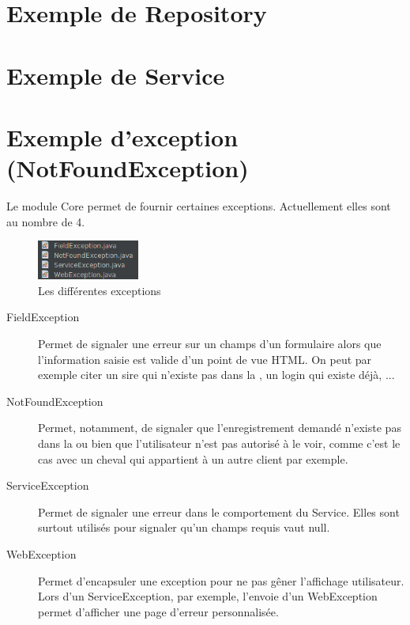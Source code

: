 	\section{Exemple de Repository}

	\section{Exemple de Service}

	\section{Exemple d'exception (NotFoundException)}
		Le module Core permet de fournir certaines exceptions. Actuellement elles sont au nombre de 4.

		\begin{figure}[H]
			\centering\includegraphics[width=0.30\textwidth, keepaspectratio]{res/exceptions.png}
			\caption{Les différentes exceptions}
		\end{figure}

		\begin{description}
			\item[FieldException]{Permet de signaler une erreur sur un champs d'un formulaire alors que l'information saisie est valide d'un point de vue HTML. On peut par exemple citer un sire qui n'existe pas dans la \bdd{}, un login qui existe déjà, ...}
			\item[NotFoundException]{Permet, notamment, de signaler que l'enregistrement demandé n'existe pas dans la \bdd{} ou bien que l'utilisateur n'est pas autorisé à le voir, comme c'est le cas avec un cheval qui appartient à un autre client par exemple.}
			\item[ServiceException]{Permet de signaler une erreur dans le comportement du Service. Elles sont surtout utilisés pour signaler qu'un champs requis vaut null.}
			\item[WebException]{Permet d'encapsuler une exception pour ne pas gêner l'affichage utilisateur. Lors d'un ServiceException, par exemple, l'envoie d'un WebException permet d'afficher une page d'erreur personnalisée.}
		\end{description}


